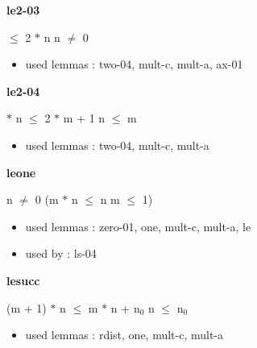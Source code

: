 \documentclass[a4paper]{article}
\begin{document}
{\large\bf le2-03}

\medskip

  $\le$ 2 $*$ n \Equiv n $\neq$ 0

\begin{itemize}


\item       used lemmas  : two-04, mult-c, mult-a, ax-01

\end{itemize}

\medskip

\bigskip

{\large\bf le2-04}

\medskip

  $*$ n $\le$ 2 $*$ m + 1 \Equiv n $\le$ m

\begin{itemize}


\item       used lemmas  : two-04, mult-c, mult-a

\end{itemize}

\medskip

\bigskip

{\large\bf leone}

\medskip

 \Fol n $\neq$ 0 \Imp (m $*$ n $\le$ n \Equiv m $\le$ 1)

\begin{itemize}


\item       used lemmas  : zero-01, one, mult-c, mult-a, le
\item       used by      : ls-04

\end{itemize}

\medskip

\bigskip

{\large\bf lesucc}

\medskip

 \Fol (m + 1) $*$ n $\le$ m $*$ n + $\mbox{n}_{0}$ \Equiv n $\le$ $\mbox{n}_{0}$

\begin{itemize}


\item       used lemmas  : rdist, one, mult-c, mult-a

\end{itemize}

\medskip

\bigskip
\end{document}
